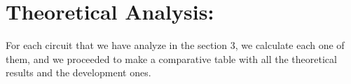 \section{Theoretical Analysis:}

For each circuit that we have analyze in the section 3, we calculate each one of them, and we proceeded to make a comparative table with all the theoretical results and the development ones. \hfill \break

{\bfseries\itshape\color{carmine}{Observation:}} {\itshape{}}
